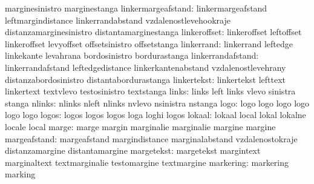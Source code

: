                            marginesinistro           marginestanga
       linkermargeafstand: linkermargeafstand        leftmargindistance
                           linkerrandabstand         vzdalenostlevehookraje
                           distanzamarginesinistro   distantamarginestanga
             linkeroffset: linkeroffset              leftoffset
                           linkeroffset              levyoffset
                           offsetsinistro            offsetstanga
               linkerrand: linkerrand                leftedge
                           linkekante                levahrana
                           bordosinistro             bordurastanga
        linkerrandafstand: linkerrandafstand         leftedgedistance
                           linkerkantenabstand       vzdalenostlevehrany
                           distanzabordosinistro     distantabordurastanga
              linkertekst: linkertekst               lefttext
                           linkertext                textvlevo
                           testosinistro             textstanga %
                    links: links                     left
                           links                     vlevo
                           sinistra                  stanga
                   nlinks: nlinks                    nleft
                           nlinks                    nvlevo
                           nsinistra                 nstanga
                     logo: logo                      logo
                           logo                      logo
                           logo                      logo
                    logos: logos                     logos
                           logos                     loga
                           loghi                     logos
                   lokaal: lokaal                    local
                           lokal                     lokalne
                           locale                    local
                    marge: marge                     margin
                           marginalie                marginalie
                           margine                   margine
             margeafstand: margeafstand              margindistance
                           marginalabstand           vzdalenostokraje
                           distanzamargine           distantamargine
               margetekst: margetekst                margintext
                           marginaltext              textmarginalie
                           testomargine              textmargine
                markering: markering                 marking
